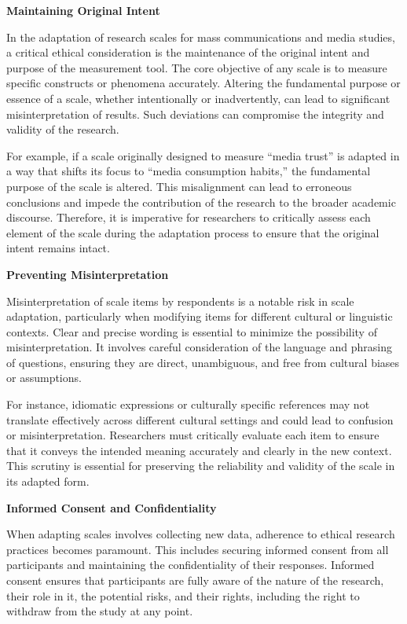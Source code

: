 \documentclass[
]{book}
\begin{document}
\textbf{Maintaining Original Intent}

In the adaptation of research scales for mass communications and media studies, a critical ethical consideration is the maintenance of the original intent and purpose of the measurement tool. The core objective of any scale is to measure specific constructs or phenomena accurately. Altering the fundamental purpose or essence of a scale, whether intentionally or inadvertently, can lead to significant misinterpretation of results. Such deviations can compromise the integrity and validity of the research.

For example, if a scale originally designed to measure ``media trust'' is adapted in a way that shifts its focus to ``media consumption habits,'' the fundamental purpose of the scale is altered. This misalignment can lead to erroneous conclusions and impede the contribution of the research to the broader academic discourse. Therefore, it is imperative for researchers to critically assess each element of the scale during the adaptation process to ensure that the original intent remains intact.

\textbf{Preventing Misinterpretation}

Misinterpretation of scale items by respondents is a notable risk in scale adaptation, particularly when modifying items for different cultural or linguistic contexts. Clear and precise wording is essential to minimize the possibility of misinterpretation. It involves careful consideration of the language and phrasing of questions, ensuring they are direct, unambiguous, and free from cultural biases or assumptions.

For instance, idiomatic expressions or culturally specific references may not translate effectively across different cultural settings and could lead to confusion or misinterpretation. Researchers must critically evaluate each item to ensure that it conveys the intended meaning accurately and clearly in the new context. This scrutiny is essential for preserving the reliability and validity of the scale in its adapted form.

\textbf{Informed Consent and Confidentiality}

When adapting scales involves collecting new data, adherence to ethical research practices becomes paramount. This includes securing informed consent from all participants and maintaining the confidentiality of their responses. Informed consent ensures that participants are fully aware of the nature of the research, their role in it, the potential risks, and their rights, including the right to withdraw from the study at any point.
\end{document}
